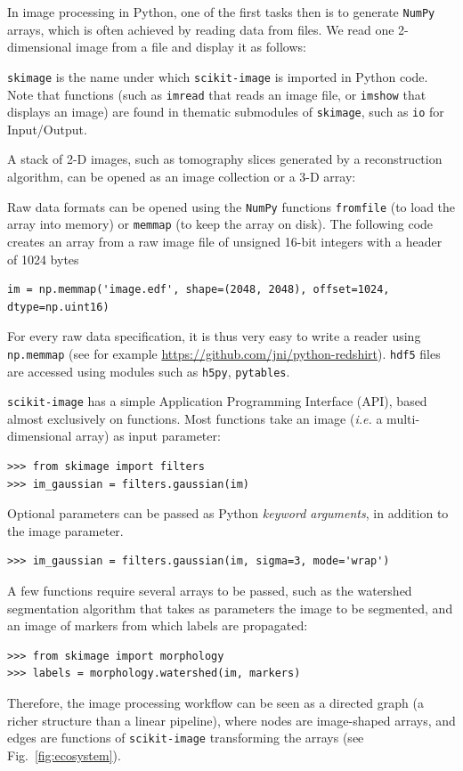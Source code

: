 \documentclass[twocolumn]{bmcart}%
\begin{document}
In image processing in Python, one of the first tasks then is to generate
\texttt{NumPy} arrays, which is often achieved by reading data from files. We
read one 2-dimensional image from a file and display it as follows:

 

\texttt{skimage} is the name under which \texttt{scikit-image} is imported in
Python code. Note that functions (such as \texttt{imread} that reads an image
file, or \texttt{imshow} that displays an image) are found in thematic submodules of
\texttt{skimage}, such as \texttt{io} for Input/Output.

A stack of 2-D images, such as tomography slices generated by a reconstruction algorithm, can be opened as an image collection or a 3-D array:

Raw data formats can be opened using the \texttt{NumPy} functions
\texttt{fromfile} (to load the array into memory) or \texttt{memmap} (to
keep the array on disk). The following code creates an array from a
raw image file of unsigned 16-bit integers with a header of 1024 bytes 
\begin{lstlisting}
im = np.memmap('image.edf', shape=(2048, 2048), offset=1024, dtype=np.uint16)
\end{lstlisting}
For every raw data specification, it is thus very easy to write a reader
using \texttt{np.memmap} (see for example
\url{https://github.com/jni/python-redshirt}). 
\texttt{hdf5} files are accessed using modules such as \texttt{h5py}, \texttt{pytables}.

\texttt{scikit-image} has a simple Application Programming Interface
(API), based almost exclusively on
functions. Most functions take an image (\emph{i.e.} a multi-dimensional
array) as input parameter:
\begin{lstlisting}
>>> from skimage import filters
>>> im_gaussian = filters.gaussian(im)
\end{lstlisting}

Optional parameters can be passed as Python \emph{keyword arguments},
in addition to the image parameter.
\begin{lstlisting}
>>> im_gaussian = filters.gaussian(im, sigma=3, mode='wrap')
\end{lstlisting}
A few functions require several arrays to be passed, such as the
watershed segmentation algorithm that takes as parameters the image to be
segmented, and an image of markers from which labels are propagated:
\begin{lstlisting}
>>> from skimage import morphology
>>> labels = morphology.watershed(im, markers)
\end{lstlisting}
Therefore, the image processing workflow can be seen as a directed graph
(a richer structure than a linear pipeline), where nodes are image-shaped arrays, and
edges are functions of \texttt{scikit-image} transforming the arrays (see
Fig.~\ref{fig:ecosystem}).
\end{document}
